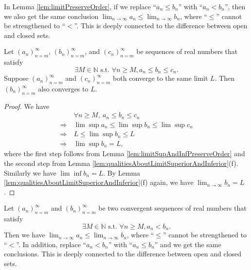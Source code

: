 \begin{rem}
  In Lemma \ref{lem:limitPreserveOrder}, if we
  replace ``$a_{n}\le b_{n}$'' with ``$a_{n}<b_{n}$'',
  then we also get the same conclusion
  $\lim_{n\rightarrow \infty} a_n\le \lim_{n\rightarrow  \infty} b_n$, 
  where ``$\le$'' cannot be strengthened to ``$<$''.
  This is deeply connected to the difference between
  open and closed sets.
\end{rem}


\begin{thm}
  \label{thm:squeezeTest}
  Let $(a_n)_{n=m}^{\infty}$, $(b_n)_{n=m}^{\infty}$,
  and $(c_n)_{n=m}^{\infty}$ be sequences of real numbers
  that satisfy
  \begin{displaymath}
    \exists M\in \mathbb{N} \text{ s.t. }
    \forall n\ge M, a_n\le b_n \le c_n.
  \end{displaymath}
  Suppose $(a_n)_{n=m}^{\infty}$ and $(c_n)_{n=m}^{\infty}$
  both converge to the same limit $L$.
  Then $(b_n)_{n=m}^{\infty}$ also converges to $L$.
\end{thm}
\begin{proof}
  We have
  \begin{align*}
    &\ \forall n\ge M,\ a_{n} \le b_{n}\le c_{n}
    \\ \Rightarrow
    &\ \lim\sup a_{n}\le \lim\sup b_{n}\le \lim\sup c_{n}
    \\ \Rightarrow
    &\ L\le \lim\sup b_{n}\le L
    \\ \Rightarrow
    &\ \lim\sup b_{n} =L,
  \end{align*}
  where the first step follows from
  Lemma \ref{lem:limitSupAndInfPreserveOrder} and the second step from
  Lemma \ref{lem:qualitiesAboutLimitSuperiorAndInferior}(f).
  Similarly we have $\lim\inf b_{n}=L.$ By Lemma
  \ref{lem:qualitiesAboutLimitSuperiorAndInferior}(f) again,
  we have $\lim_{n\rightarrow \infty}b_{n}=L$.
\end{proof}

\begin{rem}
  Let $(a_n)_{n=m}^{\infty}$ and $(b_n)_{n=m}^{\infty}$
  be two convergent sequences of real numbers
  that satisfy
  \begin{displaymath}
    \exists M\in \mathbb{N} \text{ s.t. }
    \forall n\ge M, a_n< b_n.
  \end{displaymath}
  Then we have
  $\lim_{n\rightarrow \infty} a_n\le \lim_{n\rightarrow  \infty} b_n$, 
  where ``$\le$'' cannot be strengthened to ``$<$''.
  In addition, replace ``$a_n< b_n$''
  with ``$a_n\le b_n$'' and we get the same conclusions.
  This is deeply connected to the difference between
  open and closed sets.
\end{rem}

